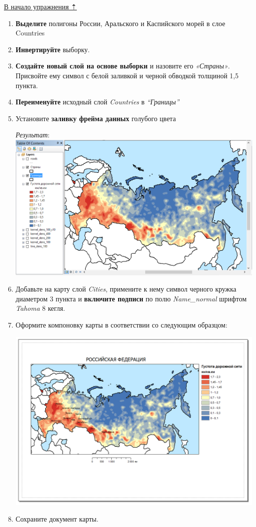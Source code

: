 \documentclass[]{book}
\theoremstyle{definition}
\theoremstyle{definition}
\theoremstyle{definition}
\theoremstyle{remark}
\begin{document}
\protect\hyperlink{density-analysis}{В начало упражнения ⇡}

\begin{enumerate}
\def\labelenumi{\arabic{enumi}.}
\item
  \textbf{Выделите} полигоны России, Аральского и Каспийского морей в
  слое Countries
\item
  \textbf{Инвертируйте} выборку.
\item
  \textbf{Создайте новый слой на основе выборки} и назовите его
  \emph{«Страны»}. Присвойте ему символ с белой заливкой и черной
  обводкой толщиной 1,5 пункта.
\item
  \textbf{Переименуйте} исходный слой \emph{Countries} в
  \emph{``Границы''}
\item
  Установите \textbf{заливку фрейма данных} голубого цвета

  \emph{Результат}: \includegraphics{images/Ex16/image18.png}
\item
  Добавьте на карту слой \emph{Cities}, примените к нему символ черного
  кружка диаметром 3 пункта и \textbf{включите подписи} по полю
  \emph{Name\_normal} шрифтом \emph{Tahoma} 8 кегля.
\item
  Оформите компоновку карты в соответствии со следующим образцом:

  \includegraphics{images/Ex16/image19.png}
\item
  Сохраните документ карты.
\end{enumerate}
\end{document}

